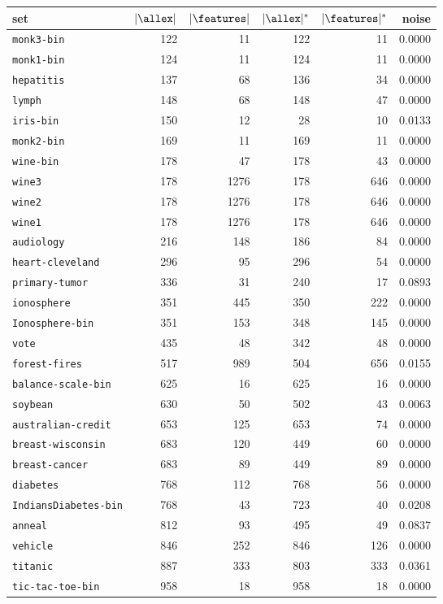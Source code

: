 \begin{tabular}{lrrrrr}
\toprule
set & $|\allex|$ & $|\features|$ & $|\allex|^*$ & $|\features|^*$ & noise \\
\midrule
\texttt{monk3-bin}& 122& 11& 122& 11& 0.0000\\
\texttt{monk1-bin}& 124& 11& 124& 11& 0.0000\\
\texttt{hepatitis}& 137& 68& 136& 34& 0.0000\\
\texttt{lymph}& 148& 68& 148& 47& 0.0000\\
\texttt{iris-bin}& 150& 12& 28& 10& 0.0133\\
\texttt{monk2-bin}& 169& 11& 169& 11& 0.0000\\
\texttt{wine-bin}& 178& 47& 178& 43& 0.0000\\
\texttt{wine3}& 178& 1276& 178& 646& 0.0000\\
\texttt{wine2}& 178& 1276& 178& 646& 0.0000\\
\texttt{wine1}& 178& 1276& 178& 646& 0.0000\\
\texttt{audiology}& 216& 148& 186& 84& 0.0000\\
\texttt{heart-cleveland}& 296& 95& 296& 54& 0.0000\\
\texttt{primary-tumor}& 336& 31& 240& 17& 0.0893\\
\texttt{ionosphere}& 351& 445& 350& 222& 0.0000\\
\texttt{Ionosphere-bin}& 351& 153& 348& 145& 0.0000\\
\texttt{vote}& 435& 48& 342& 48& 0.0000\\
\texttt{forest-fires}& 517& 989& 504& 656& 0.0155\\
\texttt{balance-scale-bin}& 625& 16& 625& 16& 0.0000\\
\texttt{soybean}& 630& 50& 502& 43& 0.0063\\
\texttt{australian-credit}& 653& 125& 653& 74& 0.0000\\
\texttt{breast-wisconsin}& 683& 120& 449& 60& 0.0000\\
\texttt{breast-cancer}& 683& 89& 449& 89& 0.0000\\
\texttt{diabetes}& 768& 112& 768& 56& 0.0000\\
\texttt{IndiansDiabetes-bin}& 768& 43& 723& 40& 0.0208\\
\texttt{anneal}& 812& 93& 495& 49& 0.0837\\
\texttt{vehicle}& 846& 252& 846& 126& 0.0000\\
\texttt{titanic}& 887& 333& 803& 333& 0.0361\\
\texttt{tic-tac-toe-bin}& 958& 18& 958& 18& 0.0000\\

\end{tabular}
